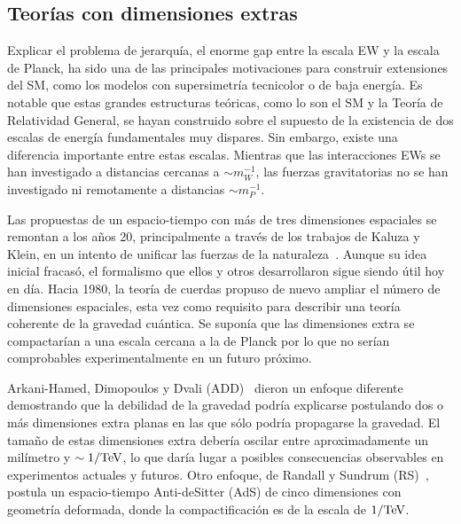 \subsection{Teorías con dimensiones extras}
\label{subsec:theory:bsm:qbh}

Explicar el problema de jerarquía, el enorme gap entre la escala \ac{EW} y la escala de Planck, ha sido una de las principales motivaciones para construir extensiones del \ac{SM}, como los modelos con supersimetría tecnicolor o de baja energía. Es notable que estas grandes estructuras teóricas, como lo son el \ac{SM} y la Teoría de Relatividad General, se hayan construido sobre el supuesto de la existencia de dos escalas de energía fundamentales muy dispares. Sin embargo, existe una diferencia importante entre estas escalas. Mientras que las interacciones \acp{EW} se han investigado a distancias cercanas a \(\sim m_W^{-1}\), las fuerzas gravitatorias no se han investigado ni remotamente a distancias \(\sim m_P^{-1}\).

Las propuestas de un espacio-tiempo con más de tres dimensiones espaciales se remontan a los años 20, principalmente a través de los trabajos de Kaluza y Klein, en un intento de unificar las fuerzas de la naturaleza~\cite{Bailin_Love-1987}. Aunque su idea inicial fracasó, el formalismo que ellos y otros desarrollaron sigue siendo útil hoy en día. Hacia 1980, la teoría de cuerdas propuso de nuevo ampliar el número de dimensiones espaciales, esta vez como requisito para describir una teoría coherente de la gravedad cuántica. Se suponía que las dimensiones extra se compactarían a una escala cercana a la de Planck por lo que no serían comprobables experimentalmente en un futuro próximo.

Arkani-Hamed, Dimopoulos y Dvali (ADD)~\cite{ADD-1998} dieron un enfoque diferente demostrando que la debilidad de la gravedad podría explicarse postulando dos o más dimensiones extra planas en las que sólo podría propagarse la gravedad. El tamaño de estas dimensiones extra debería oscilar entre aproximadamente un milímetro y \(\sim 1/\text{TeV}\), lo que daría lugar a posibles consecuencias observables en experimentos actuales y futuros. Otro enfoque, de Randall y Sundrum (RS)~\cite{RS1-1999_1,RS1-1999_2}, postula un espacio-tiempo Anti-deSitter (AdS) de cinco dimensiones con geometría deformada, donde la compactificación es de la escala de \(1/\text{TeV}\).

